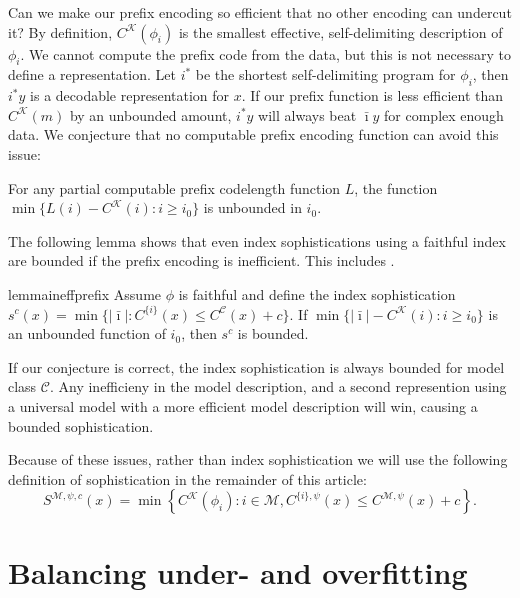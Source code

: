 \documentclass{style/llncs}
\newcommand{\M}{\mathscr M}
\newcommand{\C}{\mathscr C}
\newcommand{\K}{\mathscr K}
\begin{document}
Can we make our prefix encoding so efficient that no other encoding can undercut it? By definition, $C^{\K}(\phi_i)$ is the smallest effective, self-delimiting description of $\phi_i$. We cannot compute the prefix code from the data, but this is not necessary to define a representation. Let $i^*$ be the shortest self-delimiting program for $\phi_i$, then $i^*y$ is a decodable representation for $x$. If our prefix function is less efficient than $C^\K(m)$ by an unbounded amount, $i^*y$ will always beat $\bar\imath y$ for complex enough data. We conjecture that no computable prefix encoding function can avoid this issue:
\begin{conjecture}
For any partial computable prefix codelength function $L$, the function $\min\{L(i)-C^\K(i):i\ge i_0\}$
is unbounded in $i_0$.
\end{conjecture}
The following lemma shows that even index sophistications using a faithful index are bounded if the prefix encoding is inefficient. This includes \cite{adriaans2012facticity}.
\begin{restatable}{lemma}{ineffprefix}
Assume $\phi$ is faithful and define the index sophistication $s^c(x)=\min\{|\bar\imath|:C^{\{i\}}(x)\le C^{\C}(x)+c\}$.
If $\min\{|\bar\imath|-C^\K(i):i\ge i_0\}$ is an unbounded function of $i_0$, then $s^c$ is bounded.\label{lemma:prefix-inefficiency}
\end{restatable}
If our conjecture is correct, the index sophistication is always bounded for model class $\C$. Any inefficieny in the model description, and a second represention using a universal model with a more efficient model description will win, causing a bounded sophistication.

Because of these issues, rather than index sophistication we will use the following definition of sophistication in the remainder of this article: 
\[
S^{\M,\psi,c}(x)=\min\left\{C^\K(\phi_i):i\in\M,C^{\{i\},\psi}(x)\le C^{\M,\psi}(x)+c\right\}.
\]

\section{Balancing under- and overfitting}
\label{section:balance}
\end{document}
